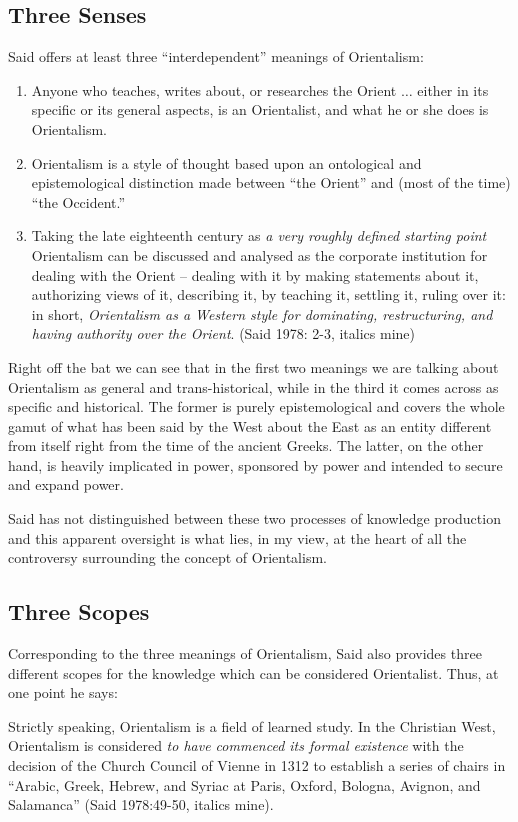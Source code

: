 \subsection*{Three Senses}

Said offers at least three “interdependent” meanings of Orientalism:
{\eleven
\renewcommand\theenumi{\alph{enumi}}
\renewcommand\labelenumi{(\theenumi)}
\begin{enumerate}
\itemsep=0pt
\item Anyone who teaches, writes about, or researches the Orient $\ldots$ either in its specific or its general aspects, is an Orientalist, and what he or she does is Orientalism.
\item Orientalism is a style of thought based upon an ontological and epistemological distinction made between “the Orient” and (most of the time) “the Occident.”
\item Taking the late eighteenth century as {\sl a very roughly defined starting point} Orientalism can be discussed and analysed as the corporate institution for dealing with the Orient – dealing with it by making statements about it, authorizing views of it, describing it, by teaching it, settling it, ruling over it: in short, {\sl Orientalism as a Western style for dominating, restructuring, and having authority over the Orient}. (Said 1978: 2-3, italics mine)
\end{enumerate}}
Right off the bat we can see that in the first two meanings we are talking about Orientalism as general and trans-historical, while in the third it comes across as specific and historical. The former is purely epistemological and covers the whole gamut of what has been said by the West about the East as an entity different from itself right from the time of the ancient Greeks. The latter, on the other hand, is heavily implicated in power, sponsored by power and intended to secure and expand power. 

Said has not distinguished between these two processes of knowledge production and this apparent oversight is what lies, in my view, at the heart of all the controversy surrounding the concept of Orientalism. 

\subsection*{Three Scopes}

Corresponding to the three meanings of Orientalism, Said also provides three different scopes for the knowledge which can be considered Orientalist. Thus, at one point he says:
\begin{myquote}
Strictly speaking, Orientalism is a field of learned study. In the Christian West, Orientalism is considered {\sl to have commenced its formal existence} with the decision of the Church Council of Vienne in 1312 to establish a series of chairs in “Arabic, Greek, Hebrew, and Syriac at Paris, Oxford, Bologna, Avignon, and Salamanca” \hfill(Said 1978:49-50, italics mine).
\end{myquote}

